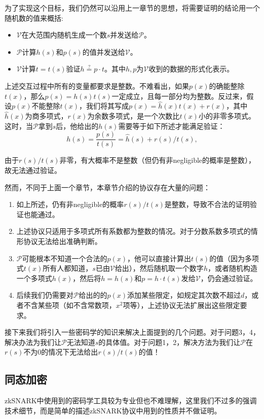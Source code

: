 \documentclass[12pt]{article}
\newcommand{\zk}{zkSNARK}
\newcommand{\pp}{$\mathcal{P}$}
\newcommand{\vv}{$\mathcal{V}$}
\begin{document}
为了实现这个目标，我们仍然可以沿用上一章节的思想，将需要证明的结论用一个随机数的值来概括:
\begin{itemize}
	\item \vv 在大范围内随机生成一个数$s$并发送给\pp。
	\item \pp 计算$h(s)$和$p(s)$的值并发送给\vv。
	\item \vv 计算$t=t(s)$验证$h\overset{?}{=} p\cdot t$。其中$h,p$为\vv 收到的数据的形式化表示。
\end{itemize}
上述交互过程中所有的变量都要求是整数。不难看出，如果$p(x)$的确能整除$t(x)$，那么$p(s)=h(s)t(s)$一定成立，且每一部分均为整数。反过来，假设$p(x)$不能整除$t(x)$，我们将其写成$p(x)=\hat{h}(x)t(x)+r(x)$，其中$\hat{h}(x)$为商多项式，$r(x)$为余数多项式，是一个次数比$t(x)$小的非零多项式。这时，当\pp 拿到$s$后，他给出的$h(s)$需要等于如下所述才能满足验证：
$$h(s)=\frac{p(s)}{t(s)}=\hat{h}(s)+r(s)/t(s),$$

由于$r(s)/t(s)$非零，有大概率不是整数（但仍有非negligible的概率是整数），故无法通过验证。

然而，不同于上面一个章节，本章节介绍的协议存在大量的问题：
\begin{enumerate}
	\item 如上所述，仍有非negligible的概率$r(s)/t(s)$是整数，导致不合法的证明验证也能通过。
	\item 上述协议只适用于多项式所有系数都为整数的情况。对于分数系数多项式的情形协议无法给出准确判断。
	\item \pp 可能根本不知道一个合法的$p(x)$，他可以直接计算出$t(s)$的值（因为多项式$t(x)$所有人都知道，$s$已由\vv 给出），然后随机取一个数字$h$，或者随机构造一个多项式$h(x)$，然后将$h=h(s)$和$p=h\cdot t(s)$发给\vv，仍会通过验证。
	\item 后续我们仍需要对\pp 给出的的$p(x)$添加某些限定，如规定其次数不超过$d$，或者不含某些项（如不含常数项，$x^2$项等），上述协议无法扩展出这些限定要求。
\end{enumerate}
接下来我们将引入一些密码学的知识来解决上面提到的几个问题。对于问题3，4，解决办法为我们让\pp 无法知道$s$的具体值。对于问题1，2，解决方法为我们让\pp 在$r(s)$不为0的情况下无法给出$r(s)/t(s)$的值！

\subsection{同态加密}
\zk 中使用到的密码学工具较为专业但也不难理解，这里我们不过多的强调技术细节，而是简单的描述\zk 协议中用到的性质并不做证明。
\end{document}

